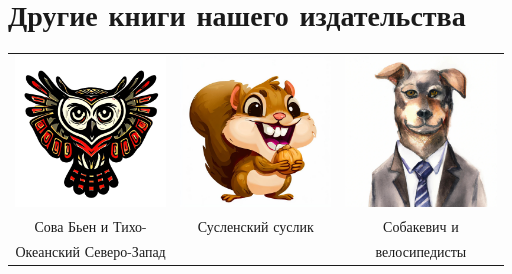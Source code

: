 \documentclass[a5paper,11pt]{memoir}
\begin{document}



\cleartorecto 
\thispagestyle{empty}  %


\section*{Другие книги нашего издательства}

\begin{table}[h]
\begin{tabular}{ccc}
\includegraphics[height=4cm]{images/cava-bien} & \includegraphics[height=4cm]{images/suslik} & \includegraphics[height=4cm]{images/sobachevich}             \\
 Сова Бьен и Тихо-  &  Сусленский суслик        &   Собакевич и            \\
 Океанский Северо-Запад           &          &    велосипедисты          \\

\end{tabular}
\end{table}
\end{document}
